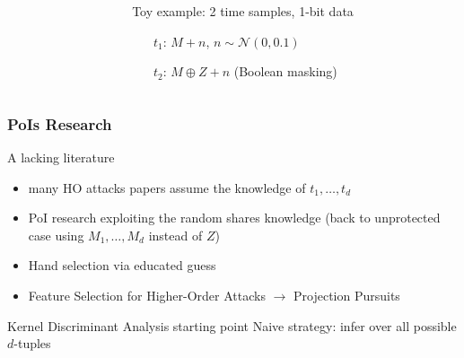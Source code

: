 \begin{frame}
{\begin{columns}
\begin{column}{.5\textwidth}
\end{column}
\begin{column}{.5\textwidth}
\begin{block}{}
Toy example: 2 time samples, 1-bit data
\begin{itemize}
\item[$t_1$:] $M + n$, $n\sim \mathcal{N}(0,0.1)$ 
\item[$t_2$:] $M\oplus Z + n$ (Boolean masking)
\end{itemize}
\end{block}
\end{column}
\end{columns}
}

\end{frame}
%

\begin{frame}
\frametitle{PoIs Research}

\begin{block}{A lacking literature}
\begin{itemize}
\item many HO attacks papers assume the knowledge of $t_1,\dots, t_d$
\item PoI research exploiting the random shares knowledge (back to unprotected case using $M_1,\dots , M_d$ instead of $Z$)
\item Hand selection via educated guess \cite{Oswald2006}
\item Feature Selection for Higher-Order Attacks $\longrightarrow$ Projection Pursuits \cite{PP}
\end{itemize}
\end{block}

\begin{block}{Kernel Discriminant Analysis starting point}
Naive strategy: infer over all possible $d$-tuples 
\end{block}
\end{frame}

